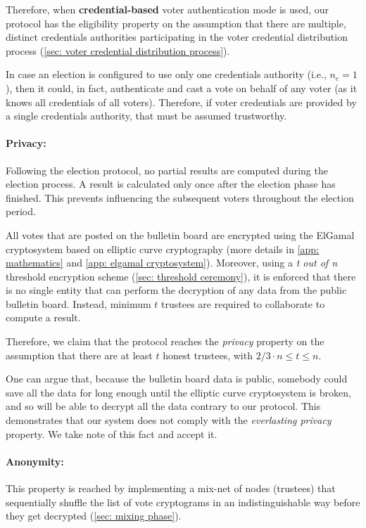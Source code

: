 Therefore, when \textbf{credential-based} voter authentication mode is used, our protocol has the eligibility property on the assumption that there are multiple, distinct credentials authorities participating in the voter credential distribution process (\cref{sec: voter credential distribution process}).

In case an election is configured to use only one credentials authority (i.e., $n_\mathrm{c} = 1$), then it could, in fact, authenticate and cast a vote on behalf of any voter (as it knows all credentials of all voters). Therefore, if voter credentials are provided by a single credentials authority, that must be assumed trustworthy.


\paragraph{Privacy:}
Following the election protocol, no partial results are computed during the election process. A result is calculated only once after the election phase has finished. This prevents influencing the subsequent voters throughout the election period.

All votes that are posted on the bulletin board are encrypted using the ElGamal cryptosystem based on elliptic curve cryptography (more details in \cref{app: mathematics} and \cref{app: elgamal cryptosystem}). Moreover, using a \textit{t out of n} threshold encryption scheme (\cref{sec: threshold ceremony}), it is enforced that there is no single entity that can perform the decryption of any data from the public bulletin board. Instead, minimum $t$ trustees are required to collaborate to compute a result.

Therefore, we claim that the protocol reaches the \textit{privacy} property on the assumption that there are at least $t$ honest trustees, with $2/3 \cdot n \leq t \leq n$.

One can argue that, because the bulletin board data is public, somebody could save all the data for long enough until the elliptic curve cryptosystem is broken, and so will be able to decrypt all the data contrary to our protocol. This demonstrates that our system does not comply with the \textit{everlasting privacy} property. We take note of this fact and accept it.


\paragraph{Anonymity:}
This property is reached by implementing a mix-net of nodes (trustees) that sequentially shuffle the list of vote cryptograms in an indistinguishable way before they get decrypted (\cref{sec: mixing phase}).

